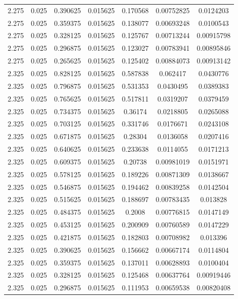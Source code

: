 \begin{flushleft}
\begin{longtable}{ccccccc}
2.275 & 0.025 & 0.390625 & 0.015625 & 0.170568 & 0.00752825 & 0.0124203  \\ 
2.275 & 0.025 & 0.359375 & 0.015625 & 0.138077 & 0.00693248 & 0.0100543  \\ 
2.275 & 0.025 & 0.328125 & 0.015625 & 0.125767 & 0.00713244 & 0.00915798  \\ 
2.275 & 0.025 & 0.296875 & 0.015625 & 0.123027 & 0.00783941 & 0.00895846  \\ 
2.275 & 0.025 & 0.265625 & 0.015625 & 0.125402 & 0.00884073 & 0.00913142  \\ 
2.325 & 0.025 & 0.828125 & 0.015625 & 0.587838 & 0.062417 & 0.0430776  \\ 
2.325 & 0.025 & 0.796875 & 0.015625 & 0.531353 & 0.0430495 & 0.0389383  \\ 
2.325 & 0.025 & 0.765625 & 0.015625 & 0.517811 & 0.0319207 & 0.0379459  \\ 
2.325 & 0.025 & 0.734375 & 0.015625 & 0.36174 & 0.0218805 & 0.0265088  \\ 
2.325 & 0.025 & 0.703125 & 0.015625 & 0.331746 & 0.0176671 & 0.0243108  \\ 
2.325 & 0.025 & 0.671875 & 0.015625 & 0.28304 & 0.0136058 & 0.0207416  \\ 
2.325 & 0.025 & 0.640625 & 0.015625 & 0.233638 & 0.0114055 & 0.0171213  \\ 
2.325 & 0.025 & 0.609375 & 0.015625 & 0.20738 & 0.00981019 & 0.0151971  \\ 
2.325 & 0.025 & 0.578125 & 0.015625 & 0.189226 & 0.00871309 & 0.0138667  \\ 
2.325 & 0.025 & 0.546875 & 0.015625 & 0.194462 & 0.00839258 & 0.0142504  \\ 
2.325 & 0.025 & 0.515625 & 0.015625 & 0.188697 & 0.00783435 & 0.013828  \\ 
2.325 & 0.025 & 0.484375 & 0.015625 & 0.2008 & 0.00776815 & 0.0147149  \\ 
2.325 & 0.025 & 0.453125 & 0.015625 & 0.200909 & 0.00760589 & 0.0147229  \\ 
2.325 & 0.025 & 0.421875 & 0.015625 & 0.182803 & 0.00708982 & 0.013396  \\ 
2.325 & 0.025 & 0.390625 & 0.015625 & 0.156662 & 0.00667174 & 0.0114804  \\ 
2.325 & 0.025 & 0.359375 & 0.015625 & 0.137011 & 0.00628893 & 0.0100404  \\ 
2.325 & 0.025 & 0.328125 & 0.015625 & 0.125468 & 0.00637764 & 0.00919446  \\ 
2.325 & 0.025 & 0.296875 & 0.015625 & 0.111953 & 0.00659538 & 0.00820408  \\ 

\end{longtable}
\end{flushleft}

